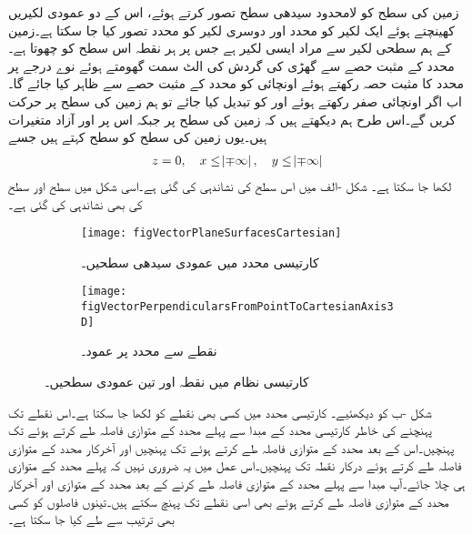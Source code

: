 زمین کی سطح کو لامحدود سیدھی سطح تصور کرتے ہوئے،  اس کے  دو عمودی لکیریں کھینچتے ہوئے ایک لکیر کو  محدد اور دوسری لکیر کو  محدد تصور کیا جا سکتا ہے۔زمین کے ہم سطحی لکیر سے مراد ایسی لکیر ہے جس پر ہر نقطہ اس سطح کو چھوتا ہے۔ محدد کے مثبت حصے  سے گھڑی کی گردش کی الٹ سمت گھومتے ہوئے نوے درجے پر  محدد کا مثبت حصہ رکھتے ہوئے اونچائی کو  محدد کے مثبت حصے  سے ظاہر کیا جائے گا۔ اب اگر اونچائی صفر رکھتے ہوئے  اور  کو تبدیل کیا جائے تو ہم زمین کی سطح پر حرکت کریں گے۔اس طرح ہم دیکھتے ہیں کہ زمین کی سطح پر  جبکہ اس پر  اور  آزاد متغیرات ہیں۔یوں زمین کی سطح کو  سطح کہتے ہیں جسے
\begin{align*}
z=0, \quad  x\le \abs{\mp \infty}, \quad y \le \abs{\mp \infty}
\end{align*} 
لکھا جا سکتا ہے۔  شکل -الف میں اس سطح کی نشاندہی کی گئی ہے۔اسی شکل میں  سطح اور  سطح کی بھی نشاندہی کی گئی ہے۔

\begin{figure}
\centering
\begin{subfigure}{0.5\textwidth}
\centering
\texttt{[image: figVectorPlaneSurfacesCartesian]}
\caption{کارتیسی محدد میں عمودی سیدھی سطحیں۔}
\label{شکل_سمتیہ_کارتیسی_عمودی-تین_سطحیں}
\end{subfigure}%
%
\begin{subfigure}{0.5\textwidth}
\centering
\texttt{[image: figVectorPerpendicularsFromPointToCartesianAxis3D]}
\caption{نقطے سے محدد پر عمود۔}
\label{شکل_سمتیہ_نقطے_سے_کارتیسی_محدد_پر_عمود}
\end{subfigure}%
\caption{کارتیسی نظام میں نقطہ اور تین عمودی سطحیں۔}
\label{شکل_سمتیہ_کارتیسی_نقطہ_اور_عمودی_سطحیں}
\end{figure}
شکل  -ب  کو دیکھئیے۔ کارتیسی محدد میں کسی بھی نقطے کو  لکھا جا سکتا ہے۔اس نقطے تک پہنچنے کی خاطر  کارتیسی محدد کے مبدا سے پہلے  محدد کے متوازی   فاصلہ طے کرتے ہوئے  تک پہنچیں۔اس کے بعد  محدد کے متوازی  فاصلہ طے کرتے ہوئے  تک پہنچیں  اور آخرکار  محدد کے متوازی  فاصلہ طے کرتے ہوئے درکار نقطہ  تک پہنچیں۔اس عمل میں یہ ضروری نہیں کہ پہلے  محدد کے متوازی ہی چلا جائے۔آپ مبدا سے پہلے  محدد کے متوازی  فاصلہ طے کرنے کے بعد  محدد کے متوازی  اور آخرکار  محدد کے متوازی  فاصلہ طے کرتے ہوئے بھی اسی نقطے تک پہنچ سکتے ہیں۔تینوں فاصلوں کو کسی بھی ترتیب سے طے کیا جا سکتا ہے۔

